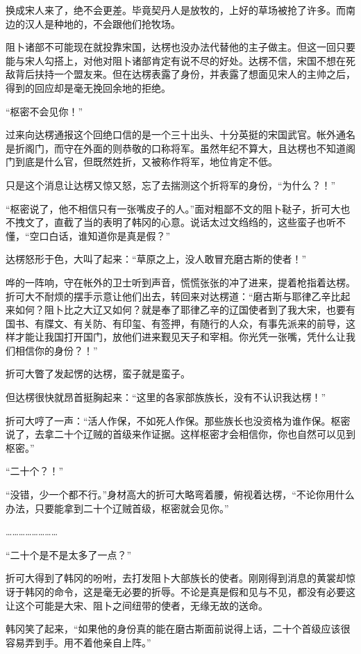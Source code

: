 换成宋人来了，绝不会更差。毕竟契丹人是放牧的，上好的草场被抢了许多。而南边的汉人是种地的，不会跟他们抢牧场。

阻卜诸部不可能现在就投靠宋国，达楞也没办法代替他的主子做主。但这一回只要能与宋人勾搭上，对他对阻卜诸部肯定有说不尽的好处。达楞不信，宋国不想在死敌背后扶持一个盟友来。但在达楞表露了身份，并表露了想面见宋人的主帅之后，得到的回应却是毫无挽回余地的拒绝。

“枢密不会见你！”

过来向达楞通报这个回绝口信的是一个三十出头、十分英挺的宋国武官。帐外通名是折阁门，而守在外面的则恭敬的口称将军。虽然年纪不算大，且达楞也不知道阁门到底是什么官，但既然姓折，又被称作将军，地位肯定不低。

只是这个消息让达楞又惊又怒，忘了去揣测这个折将军的身份，“为什么？！”

“枢密说了，他不相信只有一张嘴皮子的人。”面对粗鄙不文的阻卜鞑子，折可大也不拽文了，直截了当的表明了韩冈的心意。说话太过文绉绉的，这些蛮子也听不懂，“空口白话，谁知道你是真是假？”

达楞怒形于色，大叫了起来：“草原之上，没人敢冒充磨古斯的使者！”

哗的一阵响，守在帐外的卫士听到声音，慌慌张张的冲了进来，提着枪指着达楞。折可大不耐烦的摆手示意让他们出去，转回来对达楞道：“磨古斯与耶律乙辛比起来如何？阻卜比之大辽又如何？就是奉了耶律乙辛的辽国使者到了我大宋，也要有国书、有牒文、有关防、有印玺、有签押，有随行的人众，有事先派来的前导，这样才能让我国打开国门，放他们进来觐见天子和宰相。你光凭一张嘴，凭什么让我们相信你的身份？！”

折可大瞥了发起愣的达楞，蛮子就是蛮子。

但达楞很快就昂首挺胸起来：“这里的各家部族族长，没有不认识我达楞！”

折可大哼了一声：“活人作保，不如死人作保。那些族长也没资格为谁作保。枢密说了，去拿二十个辽贼的首级来作证据。这样枢密才会相信你，你也自然可以见到枢密。”

“二十个？！”

“没错，少一个都不行。”身材高大的折可大略弯着腰，俯视着达楞，“不论你用什么办法，只要能拿到二十个辽贼首级，枢密就会见你。”

……………………

“二十个是不是太多了一点？”

折可大得到了韩冈的吩咐，去打发阻卜大部族长的使者。刚刚得到消息的黄裳却惊讶于韩冈的命令，这是毫无必要的折辱。不论是真是假和见与不见，都没有必要这让这个可能是大宋、阻卜之间纽带的使者，无缘无故的送命。

韩冈笑了起来，“如果他的身份真的能在磨古斯面前说得上话，二十个首级应该很容易弄到手。用不着他亲自上阵。”


